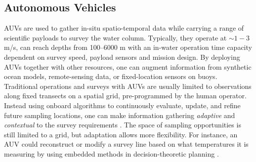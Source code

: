 \documentclass[aoas]{imsart}
\begin{document}
\subsection{Autonomous Vehicles}

AUVs are used to gather in-situ spatio-temporal data while carrying a
range of scientific payloads to survey the water column. Typically,
they operate at $\sim 1-3$ m/s, can reach depths from 100--6000 m with
an in-water operation time capacity dependent on survey speed, payload
sensors and mission design. By deploying AUVs together with other
resources, one can augment information from synthetic ocean models,
remote-sensing data, or fixed-location sensors on buoys. Traditional
operations and surveys with AUVs are usually limited to observations
along fixed transects on a spatial grid, pre-programmed by the human
operator. Instead using onboard algorithms to continuously evaluate,
update, and refine future sampling locations, one can make information
gathering \emph{adaptive} and \emph{contextual} to the survey
requirements \citep{das11b,fossum18b,fossuminformation}. The space of
sampling opportunities is still limited to a grid, but adaptation
allows more flexibility. For instance, an AUV could reconstruct or
modify a survey line based on what temperatures it is measuring by
using embedded methods in decision-theoretic planning
\citep{py10,Rajan12,Rajan12b}.


\end{document}
